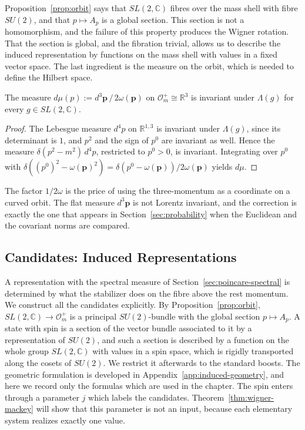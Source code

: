 	Proposition~\ref{prop:orbit} says that $SL(2,\mathbb{C})$ fibres over the mass shell with fibre $SU(2)$, and that $p\mapsto A_p$ is a global section. This section is not a homomorphism, and the failure of this property produces the Wigner rotation. That the section is global, and the fibration trivial, allows us to describe the induced representation by functions on the mass shell with values in a fixed vector space. The last ingredient is the measure on the orbit, which is needed to define the Hilbert space.
	
	\begin{lemma}\label{lem:invariant-measure}
		The measure $d\mu(p):=d^3\mathbf{p}\,/\,2\omega(\mathbf{p})$ on $\mathcal{O}_m^+\cong\mathbb{R}^3$ is invariant under $\Lambda(g)$ for every $g\in SL(2,\mathbb{C})$.
	\end{lemma}
	
	\begin{proof}
		The Lebesgue measure $d^4p$ on $\mathbb{R}^{1,3}$ is invariant under $\Lambda(g)$, since its determinant is $1$, and $p^2$ and the sign of $p^0$ are invariant as well. Hence the measure $\delta(p^2-m^2)\,d^4p$, restricted to $p^0>0$, is invariant. Integrating over $p^0$ with $\delta((p^0)^2-\omega(\mathbf{p})^2)=\delta(p^0-\omega(\mathbf{p}))/2\omega(\mathbf{p})$ yields $d\mu$.
	\end{proof}
	
	\noindent The factor $1/2\omega$ is the price of using the three-momentum as a coordinate on a curved orbit. The flat measure $d^3\mathbf{p}$ is not Lorentz invariant, and the correction is exactly the one that appears in Section~\ref{sec:probability} when the Euclidean and the covariant norms are compared.
	
	\subsection{Candidates: Induced Representations}\label{subsec:induced-candidates}
	
	A representation with the spectral measure of Section~\ref{sec:poincare-spectral} is determined by what the stabilizer does on the fibre above the rest momentum. We construct all the candidates explicitly. By Proposition~\ref{prop:orbit}, $SL(2,\mathbb{C})\to\mathcal{O}_m^+$ is a principal $SU(2)$-bundle with the global section $p\mapsto A_p$. A state with spin is a section of the vector bundle associated to it by a representation of $SU(2)$, and such a section is described by a function on the whole group $SL(2,\mathbb{C})$ with values in a spin space, which is rigidly transported along the cosets of $SU(2)$. We restrict it afterwards to the standard boosts. The geometric formulation is developed in Appendix~\ref{app:induced-geometry}, and here we record only the formulas which are used in the chapter. The spin enters through a parameter $j$ which labels the candidates. Theorem~\ref{thm:wigner-mackey} will show that this parameter is not an input, because each elementary system realizes exactly one value.
	
